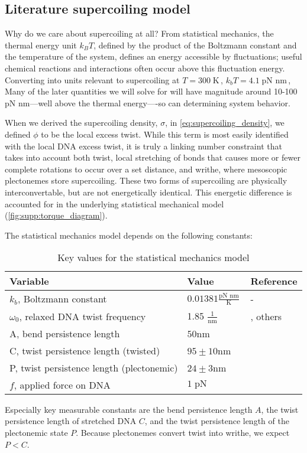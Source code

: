 \documentclass[11pt]{article}
\newcommand{\units}[2]{\frac{\text{#1}}{\text{#2}}\,}
\newcommand{\unit}[1]{\; \text{#1}\,}
\begin{document}
\subsection{Literature supercoiling model}
Why do we care about supercoiling at all? From statistical mechanics, the thermal energy unit \(k_B T\), defined by the product of the Boltzmann constant and the temperature of the system, defines an energy accessible by fluctuations; useful chemical reactions and interactions often occur above this fluctuation energy. Converting into units relevant to supercoiling at \(T = 300 \unit{K}\), \(k_b T = 4.1 \unit{pN nm}\),  Many of the later quantities we will solve for will have magnitude around 10-100 pN nm---well above the thermal energy----so can determining system behavior.

When we derived the supercoiling density, \(\sigma\), in \cref{eq:supercoiling_density}, we defined \(\phi\) to be the local excess twist. While this term is most easily identified with the local DNA excess twist, it is truly a linking number constraint that takes into account both twist, local stretching of bonds that causes more or fewer complete rotations to occur over a set distance, and writhe, where mesoscopic plectonemes store supercoiling. These two forms of supercoiling are physically interconvertable, but are not energetically identical. This energetic difference is accounted for in the underlying statistical mechanical model (\cref{fig:supp:torque_diagram}).

The statistical mechanics model depends on the following constants:
\begin{table}[h]
    \centering
    \begin{tabular}{@{}lll@{}}
        \toprule
        Variable & Value & Reference \\
        \midrule
        \(k_b\), Boltzmann constant & \(0.01381 \units{pN nm}{K}\) & - \\
        \(\omega_0\), relaxed DNA twist frequency & 1.85 \(\units{1}{nm}\) & \parencite{sevierPropertiesGeneExpression2018}, others \\
        \midrule
        A, bend persistence length & \(50\)nm & \parencite{markoTorqueDynamicsLinking2007} \\
        C, twist persistence length (twisted) & \(95 \pm 10\)nm & \parencite{markoTorqueDynamicsLinking2007} \\
        P, twist persistence length (plectonemic) & \(24 \pm 3\)nm & \parencite{markoTorqueDynamicsLinking2007} \\
        \(f\), applied force on DNA & \(1 \unit{pN}\) & \parencite{sevierPropertiesGeneExpression2018} \\
        \bottomrule
    \end{tabular}
    \caption{Key values for the statistical mechanics model}
    \label{tab:constants}
\end{table}
\FloatBarrier
Especially key measurable constants are the bend persistence length \(A\), the twist persistence length of stretched DNA \(C\), and the twist persistence length of the plectonemic
state \(P\). Because plectonemes convert twist into writhe, we expect \(P < C\).
\end{document}
